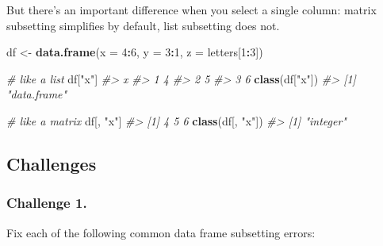 \documentclass[]{book}
\newenvironment{Shaded}{\begin{snugshade}}{\end{snugshade}}
\newcommand{\KeywordTok}[1]{\textcolor[rgb]{0.13,0.29,0.53}{\textbf{#1}}}
\newcommand{\DataTypeTok}[1]{\textcolor[rgb]{0.13,0.29,0.53}{#1}}
\newcommand{\DecValTok}[1]{\textcolor[rgb]{0.00,0.00,0.81}{#1}}
\newcommand{\StringTok}[1]{\textcolor[rgb]{0.31,0.60,0.02}{#1}}
\newcommand{\CommentTok}[1]{\textcolor[rgb]{0.56,0.35,0.01}{\textit{#1}}}
\newcommand{\OperatorTok}[1]{\textcolor[rgb]{0.81,0.36,0.00}{\textbf{#1}}}
\newcommand{\NormalTok}[1]{#1}
\begin{document}
But there's an important difference when you select a single column:
matrix subsetting simplifies by default, list subsetting does not.

\begin{Shaded}
\begin{Highlighting}[]
\NormalTok{df <-}\StringTok{ }\KeywordTok{data.frame}\NormalTok{(}\DataTypeTok{x =} \DecValTok{4}\OperatorTok{:}\DecValTok{6}\NormalTok{, }\DataTypeTok{y =} \DecValTok{3}\OperatorTok{:}\DecValTok{1}\NormalTok{, }\DataTypeTok{z =}\NormalTok{ letters[}\DecValTok{1}\OperatorTok{:}\DecValTok{3}\NormalTok{])}

\CommentTok{# like a list}
\NormalTok{df[}\StringTok{"x"}\NormalTok{]}
\CommentTok{#>   x}
\CommentTok{#> 1 4}
\CommentTok{#> 2 5}
\CommentTok{#> 3 6}
\KeywordTok{class}\NormalTok{(df[}\StringTok{"x"}\NormalTok{])}
\CommentTok{#> [1] "data.frame"}

\CommentTok{# like a matrix}
\NormalTok{df[, }\StringTok{"x"}\NormalTok{]}
\CommentTok{#> [1] 4 5 6}
\KeywordTok{class}\NormalTok{(df[, }\StringTok{"x"}\NormalTok{])}
\CommentTok{#> [1] "integer"}
\end{Highlighting}
\end{Shaded}

\subsection{Challenges}\label{challenges-9}

\subsubsection*{Challenge 1.}\label{challenge-1.-4}

Fix each of the following common data frame subsetting errors:

\begin{Shaded}
\end{Shaded}
\end{document}
